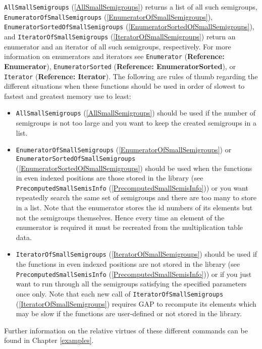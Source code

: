 \documentclass[a4paper,11pt]{report}
\begin{document}
{{\begin{Verbatim}[fontsize=\small,frame=single,label=Example]
\end{Verbatim}
 \texttt{AllSmallSemigroups} (\ref{AllSmallSemigroups}) returns a list of all such semigroups, \texttt{EnumeratorOfSmallSemigroups} (\ref{EnumeratorOfSmallSemigroups}), \texttt{EnumeratorSortedOfSmallSemigroups} (\ref{EnumeratorSortedOfSmallSemigroups}), and \texttt{IteratorOfSmallSemigroups} (\ref{IteratorOfSmallSemigroups}) return an enumerator and an iterator of all such semigroups, respectively. For
more information on enumerators and iterators see \texttt{Enumerator} (\textbf{Reference: Enumerator}), \texttt{EnumeratorSorted} (\textbf{Reference: EnumeratorSorted}), or \texttt{Iterator} (\textbf{Reference: Iterator}). The following are rules of thumb regarding the different situations when
these functions should be used in order of slowest to fastest and greatest
memory use to least: 
\begin{itemize}
\item \texttt{AllSmallSemigroups} (\ref{AllSmallSemigroups}) should be used if the number of semigroups is not too large and you want to
keep the created semigroups in a list. 
\item \texttt{EnumeratorOfSmallSemigroups} (\ref{EnumeratorOfSmallSemigroups}) or \texttt{EnumeratorSortedOfSmallSemigroups} (\ref{EnumeratorSortedOfSmallSemigroups}) should be used when the functions in even indexed positions are those stored
in the library (see \texttt{PrecomputedSmallSemisInfo} (\ref{PrecomputedSmallSemisInfo})) or you want repeatedly search the same set of semigroups and there are too
many to store in a list. Note that the enumerator stores the id numbers of its
elements but not the semigroups themselves. Hence every time an element of the
enumerator is required it must be recreated from the multiplication table
data. 
\item \texttt{IteratorOfSmallSemigroups} (\ref{IteratorOfSmallSemigroups}) should be used if the functions in even indexed positions are not stored in
the library (see \texttt{PrecomputedSmallSemisInfo} (\ref{PrecomputedSmallSemisInfo})) or if you just want to run through all the semigroups satisfying the
specified parameters once only. Note that each new call of \texttt{IteratorOfSmallSemigroups} (\ref{IteratorOfSmallSemigroups}) requires \textsf{GAP} to recompute its elements which may be slow if the functions are user-defined
or not stored in the library.
\end{itemize}
 Further information on the relative virtues of these different commands can be
found in Chapter \ref{examples}.

}}
\end{document}
